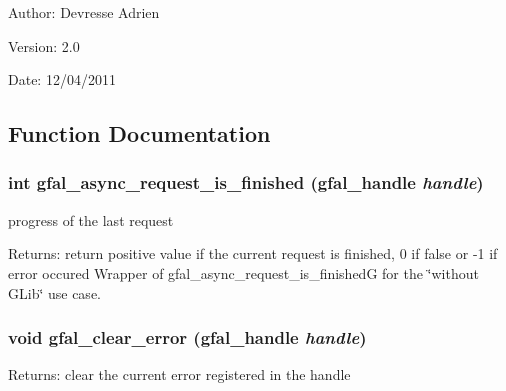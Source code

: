 \begin{Desc}
\item[Author:]Devresse Adrien \end{Desc}
\begin{Desc}
\item[Version:]2.0 \end{Desc}
\begin{Desc}
\item[Date:]12/04/2011 \end{Desc}


\subsection{Function Documentation}
\subsubsection{\setlength{\rightskip}{0pt plus 5cm}int gfal\_\-async\_\-request\_\-is\_\-finished (gfal\_\-handle {\em handle})}\label{gfal__common__interface_8c_ce6fcac8e92ad2e1d699eed2ce74a257}


progress of the last request 

\begin{Desc}
\item[Returns:]return positive value if the current request is finished, 0 if false or -1 if error occured Wrapper of gfal\_\-async\_\-request\_\-is\_\-finished\-G for the \char`\"{}without GLib\char`\"{} use case. \end{Desc}
\subsubsection{\setlength{\rightskip}{0pt plus 5cm}void gfal\_\-clear\_\-error (gfal\_\-handle {\em handle})}\label{gfal__common__interface_8c_4ca376cf47166fabd46a45fccb863ebe}


\begin{Desc}
\item[Returns:]clear the current error registered in the handle \end{Desc}
